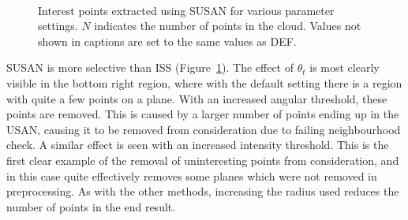 \documentclass[11pt,a4paper]{kth-mag}
\begin{document}
\begin{figure}
{    
    \\
  }
  \caption{Interest points extracted using SUSAN for various parameter settings.
    $N$ indicates the number of points in the cloud. Values not shown in
    captions are set to the same values as DEF.}
  \label{fig:intsusan}
\end{figure}

SUSAN is more selective than ISS (Figure~\ref{fig:intsusan}). The effect of
$\theta_t$ is most clearly visible in the bottom right region, where with the
default setting there is a region with quite a few points on a plane. With an
increased angular threshold, these points are removed. This is caused by a
larger number of points ending up in the USAN, causing it to be removed from
consideration due to failing neighbourhood check. A similar effect is seen with
an increased intensity threshold. This is the first clear example of the removal
of uninteresting points from consideration, and in this case quite effectively
removes some planes which were not removed in preprocessing. As with the other
methods, increasing the radius used reduces the number of points in the end
result.
\end{document}

